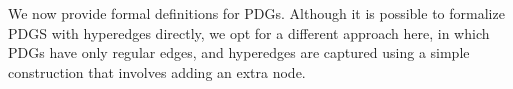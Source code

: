 \documentclass{article}
\theoremstyle{plain}
\theoremstyle{definition}
\theoremstyle{remark}
\newcommand{\MN}{PDG}
\newcommand{\MNs}{\MN s}
\numberwithin{equation}{section}
\begin{document}
	        
We now provide formal definitions for PDGs.        
	Although it is possible to formalize PDGS with hyperedges directly,
        we opt for a different approach here, in which PDGs 
		have only regular edges,
	 	and hyperedges are captured using a simple construction
        that involves adding an extra node.
\end{document}
